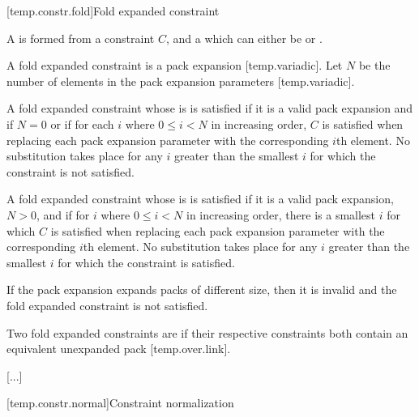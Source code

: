 \documentclass{wg21}
\begin{document}

\begin{addedblock}
[temp.constr.fold]{Fold expanded constraint}

A  is formed from a constraint $C$, and a  which can either be \tcode{\&\&} or \tcode{||}.



A fold expanded constraint is a pack expansion [temp.variadic]. Let $N$ be the number of elements in the pack expansion parameters [temp.variadic].

A fold expanded constraint whose  is \tcode{\&\&} is satisfied if it is a valid pack expansion and if $N = 0$ or if for each $i$ where $0 \le i < N$ in increasing order, $C$ is satisfied when replacing each pack expansion parameter with the corresponding $i$th element. No substitution takes place for any $i$ greater than the smallest $i$ for which the constraint is not satisfied.

A fold expanded constraint whose  is \tcode{||} is satisfied if it is a valid pack expansion, $N > 0$, and if for $i$ where $0 \le i < N$ in increasing order, there is a smallest $i$ for which $C$ is satisfied when replacing each pack expansion parameter with the corresponding $i$th element. No substitution takes place for any $i$ greater than the smallest $i$ for which the constraint is satisfied.

\begin{note}
If the pack expansion expands packs of different size, then it is invalid and the fold expanded constraint is not satisfied.
\end{note}

Two fold expanded constraints are  if
their respective constraints both contain an equivalent unexpanded pack [temp.over.link].
\end{addedblock}

\textcolor{noteclr}{[...]}

[temp.constr.normal]{Constraint normalization}
%
\end{document}
